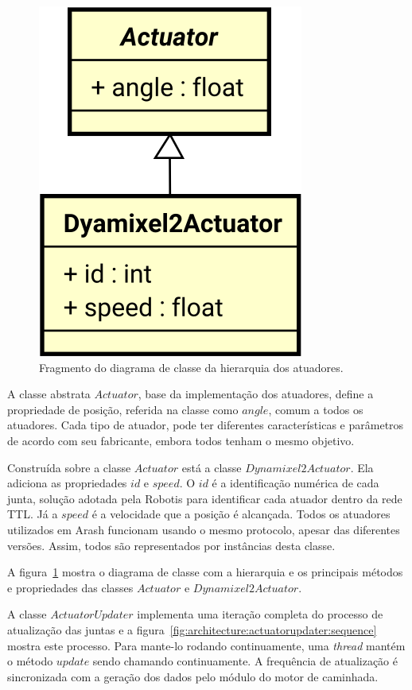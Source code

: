 \begin{figure}[htb]
	\centering
	\includegraphics[scale=0.6]{imagens/svg/softwarearchitecture-actuators-hierarchy}
	\caption{Fragmento do diagrama de classe da hierarquia dos atuadores.}
	\label{fig:architecture:actuator:classdiagram}
\end{figure}

A classe abstrata $Actuator$, base da implementação dos atuadores, define a propriedade de posição, referida na classe como $angle$, comum a todos os atuadores. Cada tipo de atuador, pode ter diferentes características e parâmetros de acordo com seu fabricante, embora todos tenham o mesmo objetivo.

Construída sobre a classe $Actuator$ está a classe $Dynamixel2Actuator$. Ela adiciona as propriedades $id$ e $speed$. O $id$ é a identificação numérica de cada junta, solução adotada pela Robotis para identificar cada atuador dentro da rede TTL. Já a $speed$ é a velocidade que a posição é alcançada. Todos os atuadores utilizados em Arash funcionam usando o mesmo protocolo, apesar das diferentes versões. Assim, todos são representados por instâncias desta classe.

A figura~\ref{fig:architecture:actuator:classdiagram} mostra o diagrama de classe com a hierarquia e os principais métodos e propriedades das classes $Actuator$ e $Dynamixel2Actuator$.

A classe $ActuatorUpdater$ implementa uma iteração completa do processo de atualização das juntas e a figura~\ref{fig:architecture:actuatorupdater:sequence} mostra este processo. Para mante-lo rodando continuamente, uma \textit{thread} mantém o método $update$ sendo chamando continuamente. A frequência de atualização é sincronizada com a geração dos dados pelo módulo do motor de caminhada.

